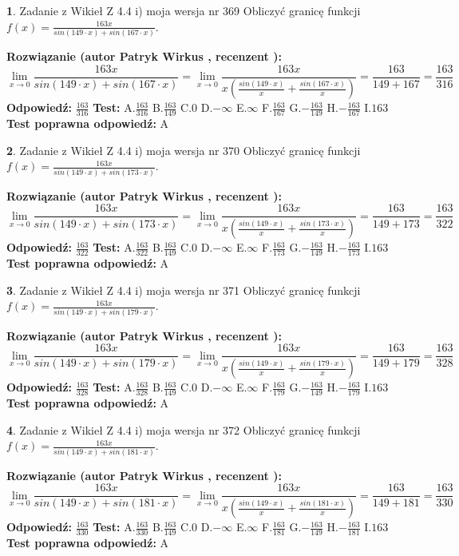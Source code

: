 \documentclass[12pt, a4paper]{article}
\theoremstyle{definition} %
\newtheorem{zad}{}
\newcommand{\zadStart}[1]{\begin{zad}#1\newline}
\newcommand{\zadStop}{\end{zad}}
\newcommand{\rozwStart}[2]{\noindent \textbf{Rozwiązanie (autor #1 , recenzent #2): }\newline}
\newcommand{\rozwStop}{\newline}
\newcommand{\odpStart}{\noindent \textbf{Odpowiedź:}\newline}
\newcommand{\odpStop}{\newline}
\newcommand{\testStart}{\noindent \textbf{Test:}\newline}
\newcommand{\testStop}{\newline}
\newcommand{\kluczStart}{\noindent \textbf{Test poprawna odpowiedź:}\newline}
\newcommand{\kluczStop}{\newline}
\begin{document}
\zadStart{Zadanie z Wikieł Z 4.4 i) moja wersja nr 369}
Obliczyć granicę funkcji $f(x)=\frac{163x}{sin(149\cdot x) +sin(167\cdot x)}$.
\zadStop
\rozwStart{Patryk Wirkus}{}
$$\lim\limits_{x\to 0}\frac{163x}{sin(149\cdot x) +sin(167\cdot x)}=\lim\limits_{x\to 0}\frac{163x}{x(\frac{sin(149\cdot x)}{x}+\frac{sin(167\cdot x)}{x})}=\frac{163}{149+167} = \frac{163}{316}$$
\rozwStop
\odpStart
$\frac{163}{316}$
\odpStop
\testStart
A.$\frac{163}{316}$
B.$\frac{163}{149}$
C.$0$
D.$-\infty$
E.$\infty$
F.$\frac{163}{167}$
G.$-\frac{163}{149}$
H.$-\frac{163}{167}$
I.$163$
\testStop
\kluczStart
A
\kluczStop



\zadStart{Zadanie z Wikieł Z 4.4 i) moja wersja nr 370}
Obliczyć granicę funkcji $f(x)=\frac{163x}{sin(149\cdot x) +sin(173\cdot x)}$.
\zadStop
\rozwStart{Patryk Wirkus}{}
$$\lim\limits_{x\to 0}\frac{163x}{sin(149\cdot x) +sin(173\cdot x)}=\lim\limits_{x\to 0}\frac{163x}{x(\frac{sin(149\cdot x)}{x}+\frac{sin(173\cdot x)}{x})}=\frac{163}{149+173} = \frac{163}{322}$$
\rozwStop
\odpStart
$\frac{163}{322}$
\odpStop
\testStart
A.$\frac{163}{322}$
B.$\frac{163}{149}$
C.$0$
D.$-\infty$
E.$\infty$
F.$\frac{163}{173}$
G.$-\frac{163}{149}$
H.$-\frac{163}{173}$
I.$163$
\testStop
\kluczStart
A
\kluczStop



\zadStart{Zadanie z Wikieł Z 4.4 i) moja wersja nr 371}
Obliczyć granicę funkcji $f(x)=\frac{163x}{sin(149\cdot x) +sin(179\cdot x)}$.
\zadStop
\rozwStart{Patryk Wirkus}{}
$$\lim\limits_{x\to 0}\frac{163x}{sin(149\cdot x) +sin(179\cdot x)}=\lim\limits_{x\to 0}\frac{163x}{x(\frac{sin(149\cdot x)}{x}+\frac{sin(179\cdot x)}{x})}=\frac{163}{149+179} = \frac{163}{328}$$
\rozwStop
\odpStart
$\frac{163}{328}$
\odpStop
\testStart
A.$\frac{163}{328}$
B.$\frac{163}{149}$
C.$0$
D.$-\infty$
E.$\infty$
F.$\frac{163}{179}$
G.$-\frac{163}{149}$
H.$-\frac{163}{179}$
I.$163$
\testStop
\kluczStart
A
\kluczStop



\zadStart{Zadanie z Wikieł Z 4.4 i) moja wersja nr 372}
Obliczyć granicę funkcji $f(x)=\frac{163x}{sin(149\cdot x) +sin(181\cdot x)}$.
\zadStop
\rozwStart{Patryk Wirkus}{}
$$\lim\limits_{x\to 0}\frac{163x}{sin(149\cdot x) +sin(181\cdot x)}=\lim\limits_{x\to 0}\frac{163x}{x(\frac{sin(149\cdot x)}{x}+\frac{sin(181\cdot x)}{x})}=\frac{163}{149+181} = \frac{163}{330}$$
\rozwStop
\odpStart
$\frac{163}{330}$
\odpStop
\testStart
A.$\frac{163}{330}$
B.$\frac{163}{149}$
C.$0$
D.$-\infty$
E.$\infty$
F.$\frac{163}{181}$
G.$-\frac{163}{149}$
H.$-\frac{163}{181}$
I.$163$
\testStop
\kluczStart
A
\kluczStop
\end{document}
